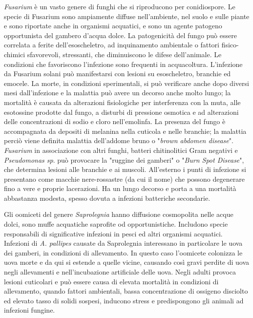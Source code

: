 \documentclass[11pt,a4paper,italian,twoside,openany]{memoir}
\begin{document}
\begin{enumerate}[label={\alph*)}]
  \emph{Fusarium} è un vasto genere di funghi che si riproducono per conidiospore. Le specie di Fusarium sono ampiamente diffuse nell'ambiente, nel suolo e sulle piante e sono riportate anche in organismi acquatici, e sono un agente patogeno opportunista del gambero d'acqua dolce. La patogenicità del fungo può essere correlata a ferite dell'esoscheletro, ad inquinamento ambientale o fattori fisico-chimici sfavorevoli, stressanti, che diminuiscono le difese dell'animale. Le condizioni che favoriscono l'infezione sono frequenti in acquacoltura. L'infezione da Fusarium solani può manifestarsi con lesioni su esoscheletro, branchie ed emocele. La morte, in condizioni sperimentali, si può verificare anche dopo diversi mesi dall'infezione e la malattia può avere un decorso anche molto lungo; la mortalità è causata da alterazioni fisiologiche per interferenza con la muta, alle esotossine prodotte dal fungo, a disturbi di pressione osmotica e ad alterazioni delle concentrazioni di sodio e cloro nell'emolinfa. La presenza del fungo è accompagnata da depositi di melanina nella cuticola e nelle branchie; la malattia perciò viene definita malattia dell'addome bruno o "\emph{brown abdomen disease}". \emph{Fusarium} in associazione con altri funghi, batteri chitinolitici Gram negativi e \emph{Pseudomonas sp}. può provocare la "ruggine dei gamberi" o "\emph{Burn Spot Disease}", che determina lesioni alle branchie e ai muscoli. All'esterno i punti di infezione si presentano come macchie nere-rossastre (da cui il nome) che possono degenerare fino a vere e proprie lacerazioni. Ha un lungo decorso e porta a una mortalità abbastanza modesta, spesso dovuta a infezioni batteriche secondarie.

  Gli oomiceti del genere \emph{Saprolegnia} hanno diffusione cosmopolita nelle acque dolci, sono muffe acquatiche saprofite od opportunistiche. Includono specie responsabili di significative infezioni in pesci ed altri organismi acquatici. Infezioni di \emph{A. pallipes} causate da Saprolegnia interessano in particolare le uova dei gamberi, in condizioni di allevamento. In questo caso l'oomicete colonizza le uova morte e da qui si estende a quelle vicine, causando così gravi perdite di uova negli allevamenti e nell'incubazione artificiale delle uova. Negli adulti provoca lesioni cuticolari e può essere causa di elevata mortalità in condizioni di allevamento, quando fattori ambientali, bassa concentrazione di ossigeno disciolto ed elevato tasso di solidi sospesi, inducono stress e predispongono gli animali ad infezioni fungine.
  

\end{enumerate}
\end{document}
